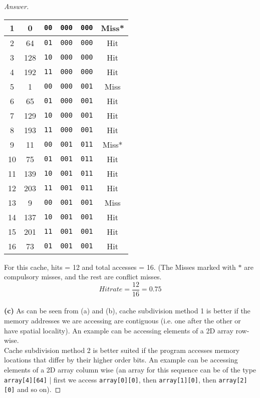 \documentclass[12pt]{article}
\begin{document}
\begin{proof}[Answer]
\begin{center}
\begin{tabular}{||c | c |  c | c | c | c ||}
1 & 0 & \verb|00| & \verb|000| & \verb|000| & Miss* \\ \hline
2 & 64 & \verb|01| & \verb|000| & \verb|000| & Hit \\ \hline
3 &128 & \verb|10| & \verb|000| & \verb|000| & Hit \\ \hline 
4 & 192 & \verb|11| & \verb|000| & \verb|000| & Hit \\ \hline
5 & 1 & \verb|00| & \verb|000| & \verb|001| & Miss\\ \hline
6 & 65 & \verb|01| & \verb|000| & \verb|001| & Hit \\ \hline
7 & 129 & \verb|10| & \verb|000| & \verb|001| & Hit \\ \hline
8 & 193 & \verb|11| & \verb|000| & \verb|001| & Hit \\ \hline
9 & 11 & \verb|00| & \verb|001| & \verb|011| & Miss* \\ \hline
10 & 75 & \verb|01| & \verb|001| & \verb|011| & Hit \\ \hline
11 & 139 & \verb|10| & \verb|001| & \verb|011| & Hit \\ \hline
12 & 203 & \verb|11| & \verb|001| & \verb|011| & Hit \\ \hline
13 & 9 & \verb|00| & \verb|001| & \verb|001| & Miss \\ \hline
14 & 137 & \verb|10| & \verb|001| & \verb|001| & Hit \\ \hline
15 & 201 & \verb|11| & \verb|001| & \verb|001| & Hit \\  \hline
16 & 73 & \verb|01| & \verb|001| & \verb|001| & Hit \\ \hline
\end{tabular}
\end{center}
For this cache, hits = 12 and total accesses = 16. (The Misses marked with $*$ are compulsory misses, and the rest are conflict misses. \\
\[ Hit rate = \frac{12}{16} = 0.75 \]  
\\
\textbf{(c)} As can be seen from (a) and (b), cache subdivision method 1 is better if the memory addresses we are accessing are contiguous (i.e. one after the other or have spatial locality). An example can be accessing elements of a 2D array row-wise. \\ Cache subdivision method 2 is better suited if the program accesses memory locations  that differ by their higher order bits. An example can be accessing elements of a 2D array column wise (an array for this sequence can be of the type \verb|array[4][64]| | first we access \verb|array[0][0]|, then \verb|array[1][0]|, then \verb|array[2][0]| and so on).
\end{proof}
\end{document}
